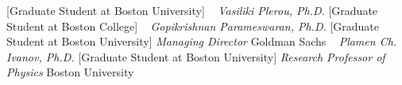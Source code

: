     [Graduate Student at Boston University]
\newline
~
\Gap{}
\textit{Vasiliki Plerou, Ph.D.}
    [Graduate Student at Boston College]
\newline
~
\Gap{}
\textit{Gopikrishnan Parameswaran, Ph.D.}
    [Graduate Student at Boston University]
\newline
    \textit{Managing Director}
    \newline
    Goldman Sachs
    \newline
~
\Gap{}
\textit{Plamen Ch. Ivanov, Ph.D.}
    [Graduate Student at Boston University]
\newline
    \textit{Research Professor of Physics}
    \newline
    Boston University
    \newline
~
\Gap\vspace*{0.2cm}